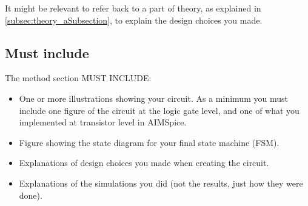 It might be relevant to refer back to a part of theory, as explained in \autoref{subsec:theory_aSubsection}, to explain the design choices you made.

\subsection{Must include}
The method section MUST INCLUDE:
\begin{itemize}
    \item One or more illustrations showing your circuit. As a minimum you must include one figure of the circuit at the logic gate level, and one of what you implemented at transistor level in AIMSpice.
    \item Figure showing the state diagram for your final state machine (FSM).
    \item Explanations of design choices you made when creating the circuit.
    \item Explanations of the simulations you did (not the results, just how they were done).
\end{itemize}